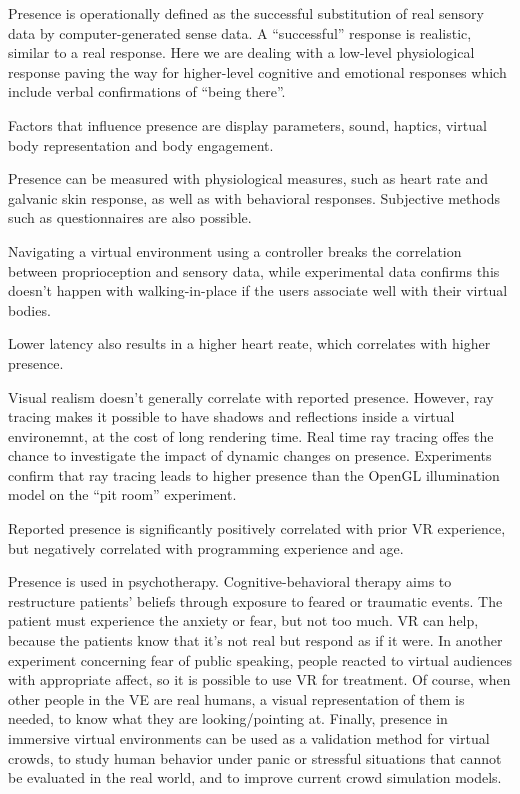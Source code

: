 \documentclass[a4paper]{article}
\begin{document}
Presence is operationally defined as the successful substitution of real
sensory data by computer-generated sense data. A ``successful'' response
is realistic, similar to a real response. Here we are dealing with a
low-level physiological response paving the way for higher-level
cognitive and emotional responses which include verbal confirmations of
``being there''.

Factors that influence presence are display parameters, sound, haptics,
virtual body representation and body engagement.

Presence can be measured with physiological measures, such as heart rate
and galvanic skin response, as well as with behavioral responses.
Subjective methods such as questionnaires are also possible.

Navigating a virtual environment using a controller breaks the
correlation between proprioception and sensory data, while experimental
data confirms this doesn't happen with walking-in-place if the users
associate well with their virtual bodies.

Lower latency also results in a higher heart reate, which correlates
with higher presence.

Visual realism doesn't generally correlate with reported presence.
However, ray tracing makes it possible to have shadows and reflections
inside a virtual environemnt, at the cost of long rendering time. Real
time ray tracing offes the chance to investigate the impact of dynamic
changes on presence. Experiments confirm that ray tracing leads to
higher presence than the OpenGL illumination model on the ``pit room''
experiment.

Reported presence is significantly positively correlated with prior VR
experience, but negatively correlated with programming experience and
age.

Presence is used in psychotherapy. Cognitive-behavioral therapy aims to
restructure patients' beliefs through exposure to feared or traumatic
events. The patient must experience the anxiety or fear, but not too
much. VR can help, because the patients know that it's not real but
respond as if it were. In another experiment concerning fear of public
speaking, people reacted to virtual audiences with appropriate affect,
so it is possible to use VR for treatment. Of course, when other people
in the VE are real humans, a visual representation of them is needed, to
know what they are looking/pointing at. Finally, presence in immersive
virtual environments can be used as a validation method for virtual
crowds, to study human behavior under panic or stressful situations that
cannot be evaluated in the real world, and to improve current crowd
simulation models.
\end{document}
